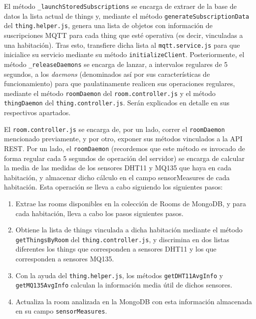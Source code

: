 \vspace{0.5cm}

El método \verb|_launchStoredSubscriptions| se encarga de extraer de la base de datos la lista actual de things y, mediante el método \verb|generateSubscriptionData| del \verb|thing.helper.js|, genera una lista de objetos con información de suscripciones MQTT para cada thing que esté operativa (es decir, vinculadas a una habitación). Tras esto, transfiere dicha lista al \verb|mqtt.service.js| para que inicialice su servicio mediante su método \verb|initializeClient|.
Posteriormente, el método \verb|_releaseDaemons| se encarga de lanzar, a intervalos regulares de 5 segundos, a los \textit{daemons} (denominados así por sus características de funcionamiento) para que paulatinamente realicen sus operaciones regulares, mediante el método \verb|roomDaemon| del \verb|room.controller.js| y el método \verb|thingDaemon| del \verb|thing.controller.js|. Serán explicados en detalle en sus respectivos apartados.

\vspace{1cm}

El \verb|room.controller.js| se encarga de, por un lado, correr el \verb|roomDaemon| mencionado previamente, y por otro, exponer sus métodos vinculados a la API REST.
Por un lado, el \verb|roomDaemon| (recordemos que este método es invocado de forma regular cada 5 segundos de operación del servidor) se encarga de calcular la media de las medidas de los sensores DHT11 y MQ135 que haya en cada habitación, y almacenar dicho cálculo en el campo sensorMeasures de cada habitación. Esta operación se lleva a cabo siguiendo los siguientes pasos:
\begin{enumerate}
    \item Extrae las rooms disponibles en la colección de Rooms de MongoDB, y para cada habitación, lleva a cabo los pasos siguientes pasos.
    \item Obtiene la lista de things vinculada a dicha habitación mediante el método \verb|getThingsByRoom| del \verb|thing.controller.js|, y discrimina en dos listas diferentes los things que corresponden a sensores DHT11 y los que corresponden a sensores MQ135.
    \item Con la ayuda del \verb|thing.helper.js|, los métodos \verb|getDHT11AvgInfo| y \verb|getMQ135AvgInfo| calculan la información media útil de dichos sensores.
    \item Actualiza la room analizada en la MongoDB con esta información almacenada en su campo \verb|sensorMeasures|.
\end{enumerate}

